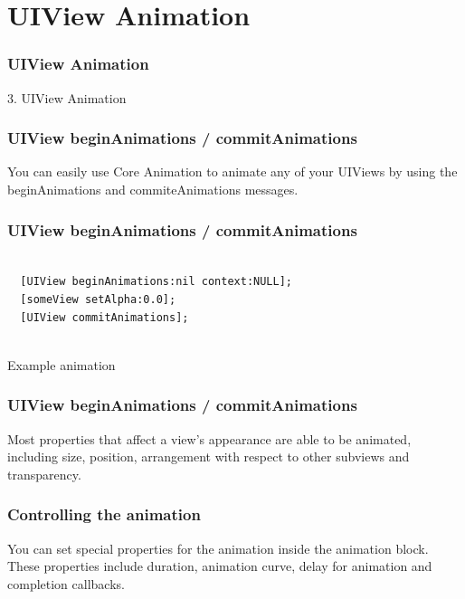 \documentclass[10pt]{beamer}
\begin{document}
    

   
  

  
    
\section{UIView Animation}
\begin{frame}[fragile]
  \frametitle{UIView Animation}
  3. UIView Animation
\end{frame}


    
\begin{frame}[fragile]
  \frametitle{UIView beginAnimations / commitAnimations}
  You can easily use Core Animation to animate any of your UIViews by using the beginAnimations  and commiteAnimations messages.

\end{frame}

\begin{frame}[fragile]
  \frametitle{UIView beginAnimations / commitAnimations}
  \begin{listing}[H]
    \begin{verbatim}
  
  [UIView beginAnimations:nil context:NULL];
  [someView setAlpha:0.0];
  [UIView commitAnimations];
              
  \end{verbatim}
    \caption{Example animation}
    \label{listing:34}
  \end{listing}

\end{frame}

\begin{frame}[fragile]
  \frametitle{UIView beginAnimations / commitAnimations}
  Most properties that affect a view's appearance are able to be animated, including size, position, arrangement with respect to other subviews  and transparency.

\end{frame}

    
\begin{frame}[fragile]
  \frametitle{Controlling the animation}
  You can set special properties for the animation inside the animation block. These properties include duration, animation curve, delay for animation and completion callbacks.

\end{frame}
\end{document}
